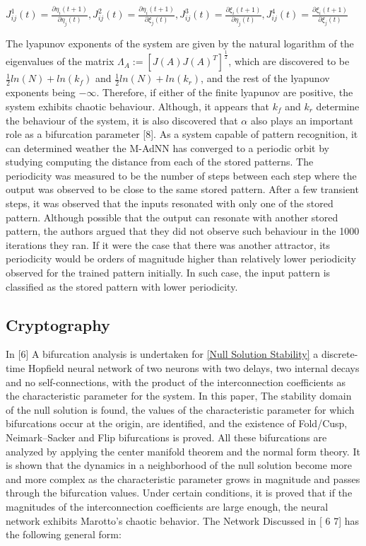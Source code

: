 \documentclass[12pt, letterpaper]{article}
\begin{document}
$J_{ij}^1(t) = \frac{\partial \eta_i(t+1)}{\partial \eta_j(t)}, J_{ij}^2(t) = \frac{\partial \eta_i(t+1)}{\partial \xi_j(t)}, J_{ij}^3(t) = \frac{\partial \xi_i(t+1)}{\partial \eta_j(t)}, J_{ij}^4(t) = \frac{\partial \xi_i(t+1)}{\partial \xi_j(t)}$

The lyapunov exponents of the system are given by the natural logarithm of the eigenvalues of the matrix $\Lambda_A := [J(A)J(A)^T]^{\frac{1}{2}}$, which are discovered to be ${\frac{1}{2}}ln(N) + ln(k_f)$ and ${\frac{1}{2}}ln(N) + ln(k_r)$, and the rest of the lyapunov exponents being $-\infty$. Therefore, if either of the finite lyapunov are positive, the system exhibits chaotic behaviour. Although, it appears that $k_f$ and $k_r$ determine the behaviour of the system, it is also discovered that $\alpha$ also plays an important role as a bifurcation parameter [8]. As a system capable of pattern recognition, it can determined weather the M-AdNN has converged to a periodic orbit by studying computing the distance from each of the stored patterns. The periodicity was measured to be the number of steps between each step where the output was observed to be close to the same stored pattern. After a few transient steps, it was observed that the inputs resonated with only one of the stored pattern. Although possible that the output can resonate with another stored pattern, the authors argued that they did not observe such behaviour in the 1000 iterations they ran. If it were the case that there was another attractor, its periodicity would be orders of magnitude higher than relatively lower periodicity observed for the trained pattern initially. In such case, the input pattern is classified as the stored pattern with lower periodicity.


\subsection*{Cryptography}
In [6] A bifurcation analysis is undertaken for \ref{Null Solution Stability} a discrete-time Hopfield neural network of two neurons with two delays, two internal decays and no self-connections, with the product of the interconnection coefficients as the characteristic parameter for the system. In this paper, The stability domain of the null solution is found, the values of the characteristic parameter for which bifurcations occur at the origin, are identified, and the existence of Fold/Cusp, Neimark–Sacker and Flip bifurcations is proved. All these bifurcations are analyzed by applying the center manifold theorem and the normal form theory. It is shown that the dynamics in a neighborhood of the null solution become more and more complex as the characteristic parameter grows in magnitude and passes through the bifurcation values. Under certain conditions, it is proved that if the magnitudes of the interconnection coefficients are large enough, the neural network exhibits Marotto’s chaotic behavior. The Network Discussed in [ 6 7] has the following general form:
\end{document}
